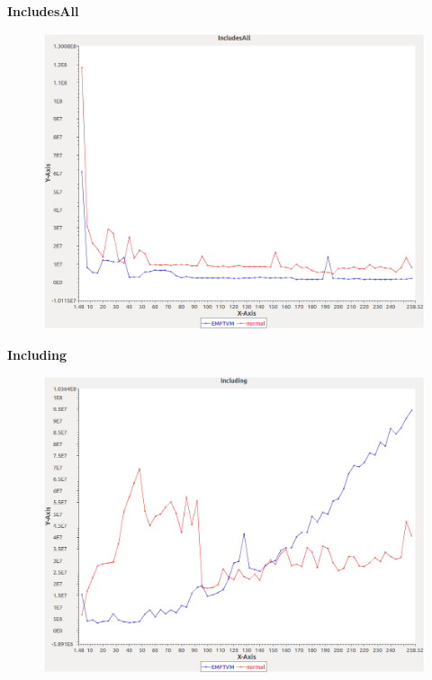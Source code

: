 \noindent\textbf{IncludesAll}

\begin{figure}[h]
\centering
\includegraphics[width=\textwidth]{../graphs/set/IncludesAll}
\end{figure}
\pagebreak

\noindent\textbf{Including}

\begin{figure}[h]
\centering
\includegraphics[width=\textwidth]{../graphs/set/Including}
\end{figure}
\pagebreak

